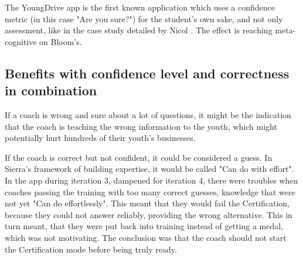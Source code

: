   The YoungDrive app is the first known application which uses a confidence metric (in this case "Are you sure?") for the student's own sake, and not only assessment, like in the case study detailed by Nicol \cite{nicol}. The effect is reaching meta-cognitive on Bloom's.





  \subsection{Benefits with confidence level and correctness in combination}
  If a coach is wrong and sure about a lot of questions, it might be the indication that the coach is teaching the wrong information to the youth, which might potentially hurt hundreds of their youth's businesses.

  If the coach is correct but not confident, it could be considered a guess. In Sierra's framework of building expertise, it would be called "Can do with effort". In the app during iteration 3, dampened for iteration 4, there were troubles when coaches passing the training with too many correct guesses, knowledge that were not yet "Can do effortlessly". This meant that they would fail the Certification, because they could not answer reliably, providing the wrong alternative. This in turn meant, that they were put back into training instead of getting a medal, which was not motivating. The conclusion was that the coach should not start the Certification mode before being truly ready.

